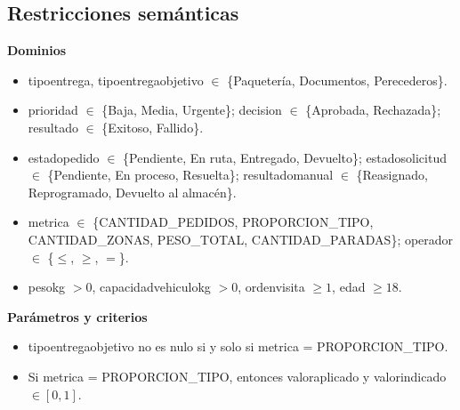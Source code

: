 \documentclass[11pt,a4paper]{article}
\newcommand{\ubrk}{\textunderscore\allowbreak}
\newcommand{\campo}[1]{\textnormal{\ttfamily\let\_\ubrk #1}}
\begin{document}
\subsection{Restricciones semánticas}\label{sec:semanticas}

\textbf{Dominios}
\begin{itemize}
\item \campo{tipo\_entrega}, \campo{tipo\_entrega\_objetivo} $\in$ \{Paquetería, Documentos, Perecederos\}.
\item \campo{prioridad} $\in$ \{Baja, Media, Urgente\}; \campo{decision} $\in$ \{Aprobada, Rechazada\}; \campo{resultado} $\in$ \{Exitoso, Fallido\}.
\item \campo{estado\_pedido} $\in$ \{Pendiente, En ruta, Entregado, Devuelto\}; \campo{estado\_solicitud} $\in$ \{Pendiente, En proceso, Resuelta\}; \campo{resultado\_manual} $\in$ \{Reasignado, Reprogramado, Devuelto al almacén\}.
\item \campo{metrica} $\in$ \{CANTIDAD\_PEDIDOS, PROPORCION\_TIPO, CANTIDAD\_ZONAS, PESO\_TOTAL, CANTIDAD\_PARADAS\}; \campo{operador} $\in$ \{$\le$, $\ge$, $=$\}.
\item \campo{peso\_kg} $> 0$, \campo{capacidad\_vehiculo\_kg} $> 0$, \campo{orden\_visita} $\ge 1$, \campo{edad} $\ge 18$.
\end{itemize}

\textbf{Parámetros y criterios}
\begin{itemize}
\item \campo{tipo\_entrega\_objetivo} no es nulo si y solo si \campo{metrica} = PROPORCION\_TIPO.
\item Si \campo{metrica} = PROPORCION\_TIPO, entonces \campo{valor\_aplicado} y \campo{valor\_indicado} $\in [0,1]$.
\end{itemize}
\end{document}

